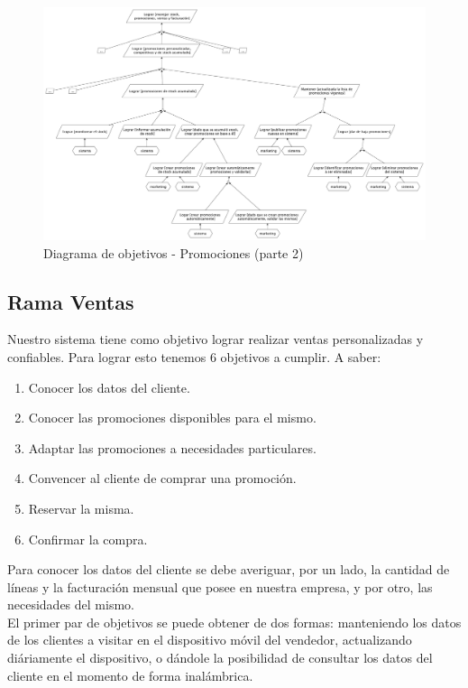 \clearpage


\begin{figure}[h!]
  \centering
  \includegraphics[width=1.3\textwidth, angle=90]{./imagenes/promociones_2.pdf}
  \caption{Diagrama de objetivos - Promociones (parte 2)}
  \label{fig:diagProm2}
\end{figure}

\clearpage

\subsection{Rama Ventas}

Nuestro sistema tiene como objetivo lograr realizar ventas personalizadas y confiables. Para lograr esto tenemos 6 objetivos a cumplir. A saber:
\begin{enumerate}
  \item Conocer los datos del cliente.
  \item Conocer las promociones disponibles para el mismo.
  \item Adaptar las promociones a necesidades particulares.
  \item Convencer al cliente de comprar una promoción.
  \item Reservar la misma.
  \item Confirmar la compra.
\end{enumerate}

\indent Para conocer los datos del cliente se debe averiguar, por un lado, la cantidad de líneas y la facturación mensual que posee en nuestra empresa, y por otro, las necesidades del mismo.\\
\indent El primer par de objetivos se puede obtener de dos formas: manteniendo los datos de los clientes a visitar en el dispositivo móvil del vendedor, actualizando diáriamente el dispositivo, o dándole la posibilidad de consultar los datos del cliente en el momento de forma inalámbrica.

